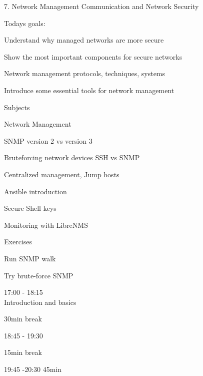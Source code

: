 \documentclass[Screen16to9,17pt]{foils}
\begin{document}
\mytitlepage
{7. Network Management}
{Communication and Network Security \the\year}



Todays goals:
\begin{list2}
\item Understand why managed networks are more secure
\item Show the most important components for secure networks
\item Network management protocols, techniques, systems
\item Introduce some essential tools for network management
\end{list2}






\begin{list1}
\item Subjects
\begin{list2}
\item Network Management
\item SNMP version 2 vs version 3
\item Bruteforcing network devices SSH vs SNMP
\item Centralized management, Jump hosts
\item Ansible introduction
\item Secure Shell keys
\item Monitoring with LibreNMS
\end{list2}
\item Exercises
\begin{list2}
\item Run SNMP walk
\item Try brute-force SNMP
\end{list2}
\end{list1}


\begin{list2}
\item 17:00 - 18:15\\
Introduction and basics
\item 30min break\\

\item 18:45 - 19:30\\

\item 15min break\\

\item 19:45 -20:30 45min\\
\end{list2}
\end{document}
